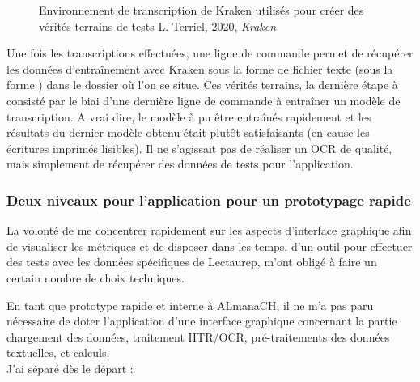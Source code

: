 \begin{figure}[h!]
    \centering
    \centerline{}
    \caption{Environnement de transcription de Kraken utilisés pour créer des vérités terrains de tests \textcopyright L. Terriel, 2020, \textit{Kraken}}
    \label{fig:transcrire_kraken}
\end{figure}

Une fois les transcriptions effectuées, une ligne de commande permet de récupérer les données d'entraînement avec Kraken sous la forme de fichier texte (sous la forme ) dans le dossier où l'on se situe. Ces vérités terrains, la dernière étape à consisté par le biai d'une dernière ligne de commande à entraîner un modèle de transcription. A vrai dire, le modèle à pu être entraînés rapidement et les résultats du dernier modèle obtenu était plutôt satisfaisants (en cause les écritures imprimés lisibles). Il ne s'agissait pas de réaliser un OCR de qualité, mais simplement de récupérer des données de tests pour l'application.

\newpage
\subsubsection{Deux niveaux pour l'application pour un prototypage rapide}

La volonté de me concentrer rapidement sur les aspects d'interface graphique afin de visualiser les métriques et de disposer dans les temps, d'un outil pour effectuer des tests avec les données spécifiques de Lectaurep, m'ont obligé à faire un certain nombre de choix techniques. 

En tant que prototype rapide et interne à ALmanaCH, il ne m'a pas paru nécessaire de doter l'application d'une interface graphique concernant la partie chargement des données, traitement HTR/OCR, pré-traitements des données textuelles, et calculs. \\

J'ai séparé dès le départ :

